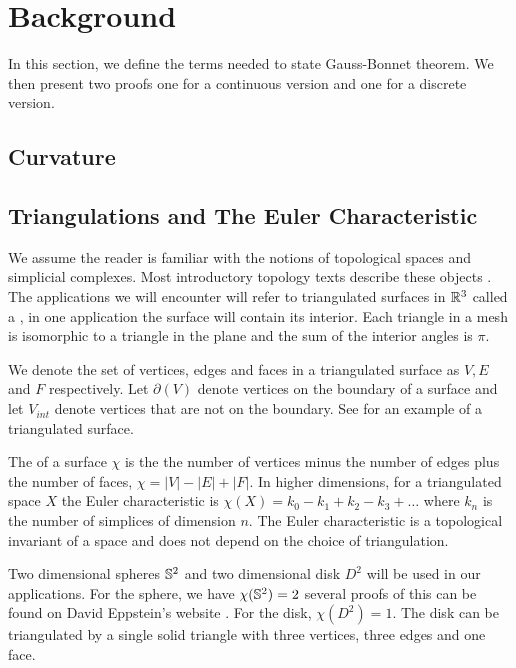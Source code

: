 \section{Background}\label{sec:background}
\label{sec:cast}

In this section, we define the terms needed to state Gauss-Bonnet theorem.
We then present two proofs one for a continuous version and one for a discrete version.


\subsection{Curvature}


\subsection{Triangulations and The Euler Characteristic}

We assume the reader is familiar with the notions
of topological spaces and simplicial complexes.
Most introductory topology texts describe these objects \cite{jm08,munkres}.
The applications we will encounter will refer to triangulated surfaces in $\mathbb{R}^3$
called a , in one application the surface will contain its interior.
Each triangle in a mesh is isomorphic to a triangle in the plane and the sum
of the interior angles is $\pi$.


We denote the set of vertices, edges and faces in a triangulated surface as 
$V, E$ and $F$ respectively.
Let $\partial(V)$ denote vertices on the boundary of a surface and let $V_{int}$ 
denote vertices that are not on the boundary.
See  for an example of a triangulated surface.



The  of a surface $\chi$ is the 
the number of vertices minus the number of edges plus  the number of faces, $\chi=|V|-|E|+|F|.$
In higher dimensions, for a triangulated space $X$ the Euler characteristic is 
$\chi(X)=k_0-k_1+k_2-k_3+\ldots$ where $k_n$ is the number of simplices of dimension $n.$
The Euler characteristic is a topological invariant of a space
and does not depend on the choice of triangulation.


Two dimensional spheres $\mathbb{S}^2$ and two dimensional disk $D^2$ 
will be used in our applications.
For the sphere, we have $\chi(\mathbb{S}^2)=2$ 
several proofs of this can be found on David Eppstein's website \cite{eppstein-proofs}.
For the disk, $\chi(D^2)=1$. The disk can be triangulated by
a single solid triangle with three vertices, three edges and one face.



